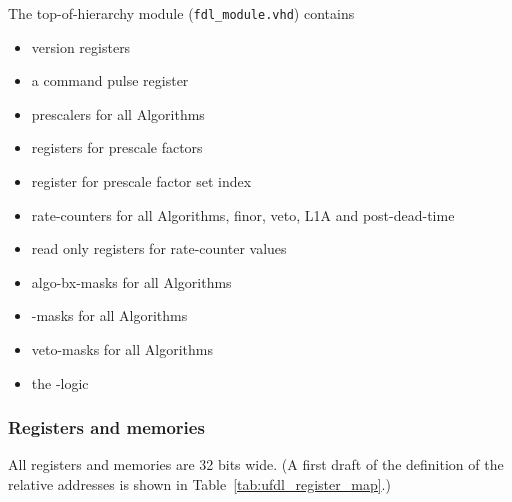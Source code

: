 The top-of-hierarchy module (\texttt{fdl\_module.vhd}) contains
\begin {itemize}
\item version registers
\item a command pulse register
\item prescalers for all Algorithms
\item registers for prescale factors
\item register for prescale factor set index
\item rate-counters for all Algorithms, finor, veto, L1A and post-dead-time
\item read only registers for rate-counter values
\item algo-bx-masks for all Algorithms
\item \finor-masks for all Algorithms
\item veto-masks for all Algorithms
\item the \finor-logic
\end {itemize}

\subsubsection{Registers and memories}
\label{sec:fdl:reg_mem}

All registers and memories are 32 bits wide. (A first draft of the definition of the relative addresses is shown in Table~\ref{tab:ufdl_register_map}.)

